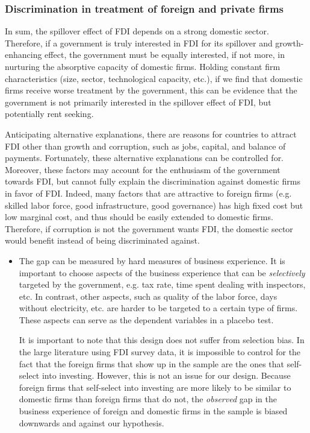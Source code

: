 \subsubsection{Discrimination in treatment of foreign and private firms}

In sum, the spillover effect of FDI depends on a strong domestic sector. Therefore, if a government is truly interested in FDI for its spillover and growth-enhancing effect, the government must be equally interested, if not more, in nurturing the absorptive capacity of domestic firms. Holding constant firm characteristics (size, sector, technological capacity, etc.), if we find that domestic firms receive worse treatment by the government, this can be evidence that the government is not primarily interested in the spillover effect of FDI, but potentially rent seeking.

Anticipating alternative explanations, there are reasons for countries to attract FDI other than growth and corruption, such as jobs, capital, and balance of payments. Fortunately, these alternative explanations can be controlled for. Moreover, these factors may account for the enthusiasm of the government towards FDI, but cannot fully explain the discrimination against domestic firms in favor of FDI. Indeed, many factors that are attractive to foreign firms (e.g. skilled labor force, good infrastructure, good governance) has high fixed cost but low marginal cost, and thus should be easily extended to domestic firms. Therefore, if corruption is not the government wants FDI, the domestic sector would benefit instead of being discriminated against.

\begin{itemize}
\item The gap can be measured by hard measures of business experience. It is important to choose aspects of the business experience that can be \textit{selectively} targeted by the government, e.g. tax rate, time spent dealing with inspectors, etc. In contrast, other aspects, such as quality of the labor force, days without electricity, etc. are harder to be targeted to a certain type of firms. These aspects can serve as the dependent variables in a placebo test.

It is important to note that this design does not suffer from selection bias. In the large literature using FDI survey data, it is impossible to control for the fact that the foreign firms that show up in the sample are the ones that self-select into investing. However, this is not an issue for our design. Because foreign firms that self-select into investing are more likely to be similar to domestic firms than foreign firms that do not, the \textit{observed} gap in the business experience of foreign and domestic firms in the sample is biased downwards and against our hypothesis.
\end{itemize}
